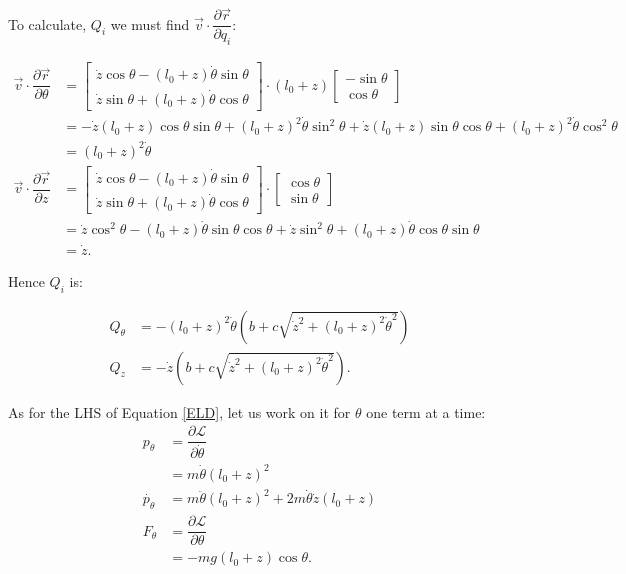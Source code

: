 \documentclass[12pt,a4paper,portrait]{article}
\begin{document}
To calculate, $Q_i$ we must find $\vec{v} \cdot \dfrac{\partial \vec{r}}{\partial q_i}$:

\begin{align*}
	\vec{v} \cdot \dfrac{\partial \vec{r}}{\partial \theta} &= \begin{bmatrix}
		\dot{z}\cos{\theta} - (l_0+z)\dot{\theta}\sin{\theta} \\
		\dot{z}\sin{\theta} + (l_0+z)\dot{\theta}\cos{\theta}
	\end{bmatrix} \cdot (l_0+z)\begin{bmatrix}
		-\sin{\theta} \\
		\cos{\theta}
	\end{bmatrix} \\
	&= -\dot{z}(l_0+z)\cos{\theta} \sin{\theta} + (l_0+z)^2 \dot{\theta}\sin^2{\theta} + \dot{z}(l_0+z)\sin{\theta} \cos{\theta} +(l_0+z)^2\dot{\theta}\cos^2{\theta} \\
	&= (l_0+z)^2 \dot{\theta} \\
	\vec{v} \cdot \dfrac{\partial \vec{r}}{\partial z} &= \begin{bmatrix}
		\dot{z}\cos{\theta} - (l_0+z)\dot{\theta}\sin{\theta} \\
		\dot{z}\sin{\theta} + (l_0+z)\dot{\theta}\cos{\theta}
	\end{bmatrix} \cdot \begin{bmatrix}
		\cos{\theta} \\
		\sin{\theta}
	\end{bmatrix} \\
	&= \dot{z}\cos^2{\theta} - (l_0+z)\dot{\theta} \sin{\theta}\cos{\theta} + \dot{z}\sin^2{\theta} + (l_0+z)\dot{\theta}\cos{\theta}\sin{\theta} \\
	&= \dot{z}. 
\end{align*}

Hence $Q_i$ is:

\begin{align*}
	Q_{\theta} &= -(l_0+z)^2 \dot{\theta} \left(b+c\sqrt{\dot{z}^2+(l_0+z)^2\dot{\theta}^2}\right) \\
	Q_z &= -\dot{z}\left(b+c\sqrt{\dot{z}^2+(l_0+z)^2\dot{\theta}^2}\right).
\end{align*}

As for the LHS of Equation \eqref{ELD}, let us work on it for $\theta$ one term at a time:
\begin{align*}
	p_{\theta} &= \dfrac{\partial \mathcal{L}}{\partial \dot{\theta}} \\
	&= m\dot{\theta}(l_0+z)^2 \\
	\dot{p_{\theta}} &= m\ddot{\theta} (l_0+z)^2 + 2m\dot{\theta}\dot{z}(l_0+z) \\
	F_{\theta} &= \dfrac{\partial \mathcal{L}}{\partial \theta} \\
	&= -mg(l_0+z)\cos{\theta}.
\end{align*}
\end{document}
